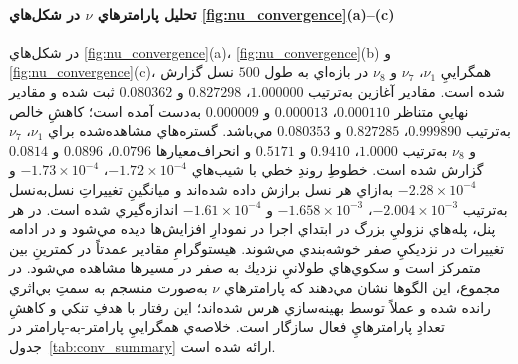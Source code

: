 \paragraph{تحليل پارامترهاي $\nu$ در شكل‌هاي \ref{fig:nu_convergence}(a)–(c)}
در شكل‌هاي \ref{fig:nu_convergence}(a)، \ref{fig:nu_convergence}(b) و \ref{fig:nu_convergence}(c)، همگراييِ $\nu_1$، $\nu_7$ و $\nu_8$ در بازه‌اي به طول $500$ نسل گزارش شده است. مقادير آغازين به‌ترتيب $1.000000$، $0.827298$ و $0.080362$ ثبت شده و مقادير نهاييِ متناظر $0.000110$، $0.000013$ و $0.000009$ به‌دست آمده است؛ كاهشِ خالص به‌ترتيب $0.999890$، $0.827285$ و $0.080353$ مي‌باشد. گستره‌هاي مشاهده‌شده براي $\nu_1$، $\nu_7$ و $\nu_8$ به‌ترتيب $1.0000$، $0.9410$ و $0.5171$ و انحراف‌معيارها $0.0796$، $0.0896$ و $0.0814$ گزارش شده است. خطوطِ روندِ خطي با شيب‌هاي $-1.72\times 10^{-4}$، $-1.73\times 10^{-4}$ و $-2.28\times 10^{-4}$ به‌ازاي هر نسل برازش داده شده‌اند و ميانگينِ تغييراتِ نسل‌به‌نسل به‌ترتيب $-2.004\times 10^{-3}$، $-1.658\times 10^{-3}$ و $-1.61\times 10^{-4}$ اندازه‌گيري شده است. در هر پنل، پله‌هاي نزوليِ بزرگ در ابتداي اجرا در نمودارِ افزايش‌ها ديده مي‌شود و در ادامه تغييرات در نزديكيِ صفر خوشه‌بندي مي‌شوند. هيستوگرامِ مقادير عمدتاً در كمترينِ بين متمركز است و سكوي‌هاي طولانيِ نزديك به صفر در مسيرها مشاهده مي‌شود. در مجموع، اين الگوها نشان مي‌دهند كه پارامترهاي $\nu$ به‌صورت منسجم به سمتِ بي‌اثري رانده شده و عملاً توسط بهينه‌سازي هرس شده‌اند؛ اين رفتار با هدفِ تنكي و كاهشِ تعدادِ پارامترهايِ فعال  سازگار است. خلاصه‌ي همگراييِ پارامتر-به-پارامتر در جدول~\ref{tab:conv_summary} ارائه شده است.




